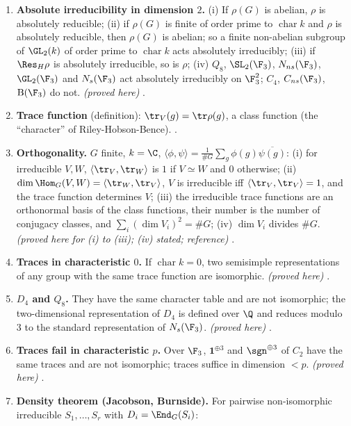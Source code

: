 \begin{enumerate}[label=\textbf{\thechapter.\arabic*}]
\emph{(proved here)} .
\item \textbf{Absolute irreducibility in dimension $2$.} (i) If $\rho(G)$ is abelian, $\rho$ is absolutely reducible; (ii) if $\rho(G)$ is finite of
order prime to $\operatorname{char}k$ and $\rho$ is absolutely reducible, then $\rho(G)$ is abelian; so a finite non-abelian subgroup of $\GL_2(k)$
of order prime to $\operatorname{char}k$ acts absolutely irreducibly; (iii) if $\Res_H\rho$ is absolutely irreducible, so is $\rho$; (iv) $Q_8$,
$\SL_2(\F_3)$, $N_{ns}(\F_3)$, $\GL_2(\F_3)$ and $N_s(\F_3)$ act absolutely irreducibly on $\F_3^2$; $C_4$, $C_{ns}(\F_3)$, $\mathrm B(\F_3)$ do not.
\emph{(proved here)} .
\item \textbf{Trace function} (definition): $\tr_V(g)=\tr\rho(g)$, a class function (the ``character'' of Riley-Hobson-Bence).
.
\item \textbf{Orthogonality.} $G$ finite, $k=\C$, $\langle\phi,\psi\rangle=\frac1{\#G}\sum_g\phi(g)\overline{\psi(g)}$: (i) for irreducible $V,W$,
$\langle\tr_V,\tr_W\rangle$ is $1$ if $V\simeq W$ and $0$ otherwise; (ii) $\dim\Hom_G(V,W)=\langle\tr_W,\tr_V\rangle$, $V$ is irreducible iff
$\langle\tr_V,\tr_V\rangle=1$, and the trace function determines $V$; (iii) the irreducible trace functions are an orthonormal basis of the
class functions, their number is the number of conjugacy classes, and $\sum_i(\dim V_i)^2=\#G$; (iv) $\dim V_i$ divides $\#G$.
\emph{(proved here for (i) to (iii); (iv) stated; reference)} .
\item \textbf{Traces in characteristic $0$.} If $\operatorname{char}k=0$, two semisimple representations of any group with the same trace
function are isomorphic. \emph{(proved here)} .
\item \textbf{$D_4$ and $Q_8$.} They have the same character table and are not isomorphic; the two-dimensional representation of $D_4$ is
defined over $\Q$ and reduces modulo $3$ to the standard representation of $N_s(\F_3)$. \emph{(proved here)} .
\item \textbf{Traces fail in characteristic $p$.} Over $\F_3$, $\mathbf 1^{\oplus3}$ and $\sgn^{\oplus3}$ of $C_2$ have the same traces and are not
isomorphic; traces suffice in dimension $<p$. \emph{(proved here)} .
\item \textbf{Density theorem (Jacobson, Burnside).} For pairwise non-isomorphic irreducible $S_1,\dots,S_r$ with $D_i=\End_G(S_i)$:

\end{enumerate}
